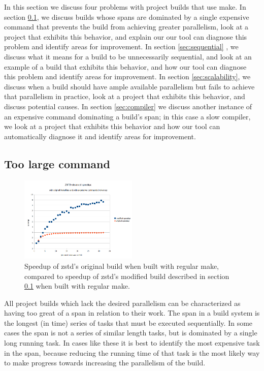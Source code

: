\documentclass[sigconf,10pt,authorversion]{acmart}\settopmatter{printfolios=true,printccs=false,printacmref=false}
\begin{document}
In this section we discuss four problems with project builds that use
make.  In section \ref{sec:expensive}, we discuss builds whose spans
are dominated by a single expensive command that prevents the build
from achieving greater parallelism, look at a project that exhibits
this behavior, and explain our our tool can diagnose this problem and
identify areas for improvement.  In section \ref{sec:sequential} , we
discuss what it means for a build to be unnecessarily sequential, and
look at an example of a build that exhibits this behavior, and how our
tool can diagnose this problem and identify areas for improvement.  In
section \ref{sec:scalability}, we discuss when a build should have
ample available parallelism but fails to achieve that parallelism in
practice, look at a project that exhibits this behavior, and discuss
potential causes.  In section \ref{sec:compiler} we discuss another
instance of an expensive command dominating a build's span; in this
case a slow compiler, we look at a project that exhibits this behavior
and how our tool can automatically diagnose it and identify areas for improvement.

\subsection{Too large command}
\label{sec:expensive}

\begin{figure}[t]
  \includegraphics[width=0.5\textwidth]{zstd-speedup}
  \caption{Speedup of zstd's original build when built with regular make,
    compared to speedup of zstd's modified build described in section \ref{sec:expensive}
  when built with regular make.}
  \label{fig:zstd}
\end{figure}

All project builds which lack the desired parallelism can be
characterized as having too great of a span in relation to their work.
The span in a build system is the longest (in time) series of tasks
that must be executed sequentially.  In some cases the span is not a
series of similar length tasks, but is dominated by a single long
running task.  In cases like these it is best to identify the most
expensive task in the span, because reducing the running time of that
task is the most likely way to make progress towards increasing the
parallelism of the build.
\end{document}
